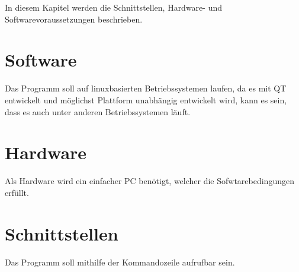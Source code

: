 In diesem Kapitel werden die Schnittstellen, Hardware- und Softwarevoraussetzungen beschrieben.
\section{Software}
Das Programm soll auf linuxbasierten Betriebssystemen laufen, da es mit QT entwickelt und möglichst Plattform unabhängig entwickelt wird, kann es sein, dass es auch unter anderen Betriebssystemen läuft.
\section{Hardware}
Als Hardware wird ein einfacher PC benötigt, welcher die Sofwtarebedingungen erfüllt.  
\section{Schnittstellen}
Das Programm soll mithilfe der Kommandozeile aufrufbar sein.